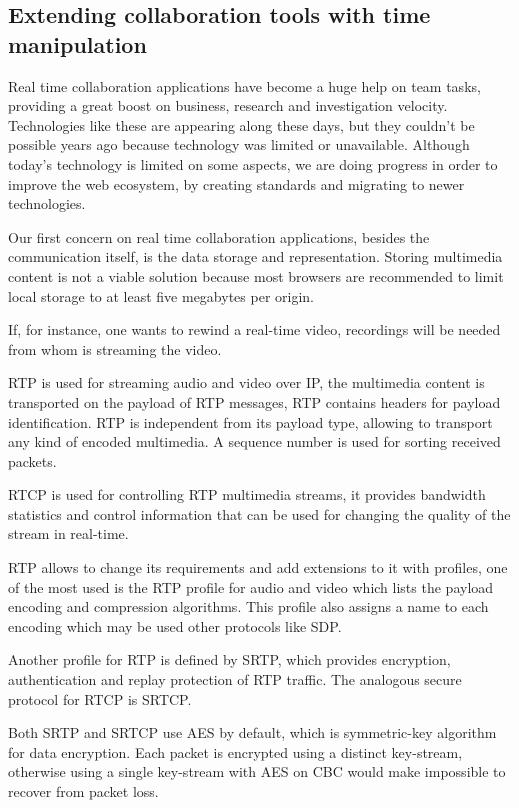 \subsection{Extending collaboration tools with time manipulation}\label{collab}

Real time collaboration applications have become a huge help on team tasks, providing a great boost on business, research and investigation velocity. Technologies like these are appearing along these days, but they couldn't be possible years ago because technology was limited or unavailable. Although today's technology is limited on some aspects, we are doing progress in order to improve the web ecosystem, by creating standards and migrating to newer technologies.

 Our first concern on real time collaboration applications, besides the communication itself, is the data storage and representation. Storing multimedia content is not a viable solution because most browsers are recommended to limit local storage to at least five megabytes per origin.

	If, for instance, one wants to rewind a real-time video, recordings will be needed from whom is streaming the video. 

  \ac{RTP}\cite{rfc3550} is used for streaming audio and video over \ac{IP}, the multimedia content is transported on the payload of \ac{RTP} messages, \ac{RTP} contains headers for payload identification. \ac{RTP} is independent from its payload type, allowing to transport any kind of encoded multimedia. A sequence number is used for sorting received packets.

\ac{RTCP} is used for controlling \ac{RTP} multimedia streams, it provides bandwidth statistics and control information that can be used for changing the quality of the stream in real-time.

  \ac{RTP} allows to change its requirements and add extensions to it with profiles, one of the most used is the \ac{RTP} profile for audio and video \cite{rfc3551} which lists the payload encoding and compression algorithms. This profile also assigns a name to each encoding which may be used other protocols like \ac{SDP}.

  Another profile for \ac{RTP} is defined by \ac{SRTP}, which provides encryption, authentication and replay protection of \ac {RTP} traffic. The analogous secure protocol for \ac{RTCP} is \ac{SRTCP}.

  Both \ac{SRTP} and \ac{SRTCP} use \ac{AES} by default, which is symmetric-key algorithm for data encryption. Each packet is encrypted using a distinct key-stream, otherwise using a single key-stream with \ac{AES} on \ac{CBC} would make impossible to recover from packet loss.

